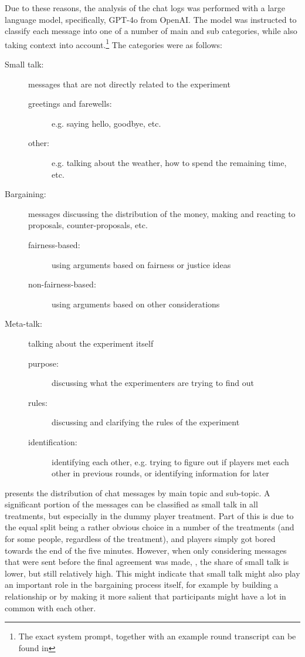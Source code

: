 Due to these reasons, the analysis of the chat logs was performed with a large language model, specifically, GPT-4o from OpenAI. The model was instructed to classify each message into one of a number of main and sub categories, while also taking context into account.\footnote{The exact system prompt, together with an example round transcript can be found in } The categories were as follows:
\begin{description}
    \item[Small talk:] messages that are not directly related to the experiment
    \begin{description}
        \item[greetings and farewells:] e.g. saying hello, goodbye, etc.
        \item[other:] e.g. talking about the weather, how to spend the remaining time, etc.
    \end{description}
    \item[Bargaining:] messages discussing the distribution of the money, making and reacting to proposals, counter-proposals, etc.
    \begin{description}
        \item[fairness-based:] using arguments based on fairness or justice ideas
        \item[non-fairness-based:] using arguments based on other considerations
    \end{description}
    \item[Meta-talk:] talking about the experiment itself
    \begin{description}
        \item[purpose:] discussing what the experimenters are trying to find out
        \item[rules:] discussing and clarifying the rules of the experiment
        \item[identification:] identifying each other, e.g. trying to figure out if players met each other in previous rounds, or identifying information for later
    \end{description}
\end{description}

 presents the distribution of chat messages by main topic and sub-topic. A significant portion of the messages can be classified as small talk in all treatments, but especially in the dummy player treatment. Part of this is due to the equal split being a rather obvious choice in a number of the treatments (and for some people, regardless of the treatment), and players simply got bored towards the end of the five minutes. However, when only considering messages that were sent before the final agreement was made, , the share of small talk is lower, but still relatively high. This might indicate that small talk might also play an important role in the bargaining process itself, for example by building a relationship or by making it more salient that participants might have a lot in common with each other.

